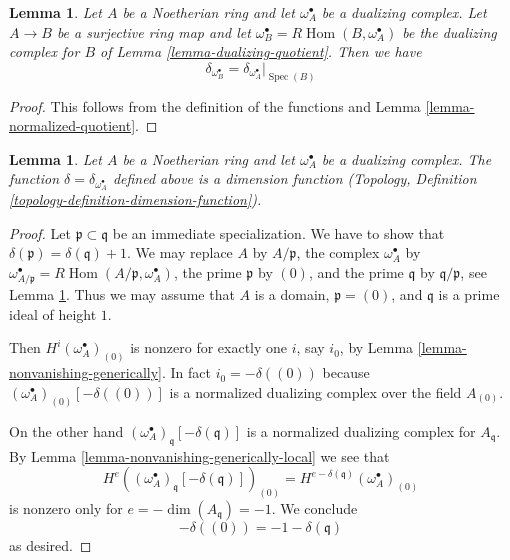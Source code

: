\documentclass{stacks-project}
\theoremstyle{plain}
\newtheorem{lemma}[subsection]{Lemma}
\theoremstyle{definition}
\theoremstyle{remark}
\numberwithin{equation}{subsection}
\def\Spec{\mathop{\mathrm{Spec}}}
\def\Hom{\mathop{\mathrm{Hom}}\nolimits}
\begin{document}
\begin{lemma}
\label{lemma-quotient-function}
Let $A$ be a Noetherian ring and let $\omega_A^\bullet$ be a dualizing
complex. Let $A \to B$ be a surjective ring map and let
$\omega_B^\bullet = R\Hom(B, \omega_A^\bullet)$ be the dualizing
complex for $B$ of Lemma \ref{lemma-dualizing-quotient}. Then we have
$$
\delta_{\omega_B^\bullet} = \delta_{\omega_A^\bullet}|_{\Spec(B)}
$$
\end{lemma}

\begin{proof}
This follows from the definition of the functions and
Lemma \ref{lemma-normalized-quotient}.
\end{proof}

\begin{lemma}
\label{lemma-dimension-function}
Let $A$ be a Noetherian ring and let $\omega_A^\bullet$ be a dualizing
complex. The function $\delta = \delta_{\omega_A^\bullet}$
defined above is a dimension function
(Topology, Definition \ref{topology-definition-dimension-function}).
\end{lemma}

\begin{proof}
Let $\mathfrak p \subset \mathfrak q$ be an immediate specialization.
We have to show that $\delta(\mathfrak p) = \delta(\mathfrak q) + 1$.
We may replace $A$ by $A/\mathfrak p$, the complex $\omega_A^\bullet$ by
$\omega_{A/\mathfrak p}^\bullet = R\Hom(A/\mathfrak p, \omega_A^\bullet)$,
the prime $\mathfrak p$ by $(0)$, and the prime $\mathfrak q$
by $\mathfrak q/\mathfrak p$,
see Lemma \ref{lemma-quotient-function}. Thus we may assume that
$A$ is a domain, $\mathfrak p = (0)$, and $\mathfrak q$ is a prime
ideal of height $1$.

\medskip\noindent
Then $H^i(\omega_A^\bullet)_{(0)}$ is nonzero
for exactly one $i$, say $i_0$, by Lemma \ref{lemma-nonvanishing-generically}.
In fact $i_0 = -\delta((0))$ because
$(\omega_A^\bullet)_{(0)}[-\delta((0))]$
is a normalized dualizing complex over the field $A_{(0)}$.

\medskip\noindent
On the other hand $(\omega_A^\bullet)_\mathfrak q[-\delta(\mathfrak q)]$
is a normalized dualizing complex for $A_\mathfrak q$. By
Lemma \ref{lemma-nonvanishing-generically-local}
we see that
$$
H^e((\omega_A^\bullet)_\mathfrak q[-\delta(\mathfrak q)])_{(0)} =
H^{e - \delta(\mathfrak q)}(\omega_A^\bullet)_{(0)}
$$
is nonzero only for $e = -\dim(A_\mathfrak q) = -1$.
We conclude
$$
-\delta((0)) = -1 - \delta(\mathfrak q)
$$
as desired.
\end{proof}
\end{document}
